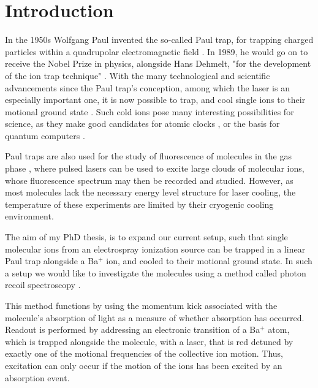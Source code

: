 
\chapter{Introduction}
\label{chap:intro}
In the 1950s Wolfgang Paul invented the so-called Paul trap, for trapping charged particles within a quadrupolar electromagnetic field \cite{PaulTrap}. In 1989, he would go on
 to receive the Nobel Prize in physics, alongside Hans Dehmelt, "for the development of the ion trap technique" \cite{NobelPrize.org}.
 With the many technological and scientific advancements since the Paul trap's conception, among which the laser is an especially important one,
 it is now possible to trap, and cool single ions to their motional ground state \cite{WinelandSideband}.
 Such cold ions pose many interesting possibilities for science, as they make good candidates for atomic clocks \cite{King2022},
 or the basis for quantum computers \cite{ZiracZoller,Kielpinski2002}.

Paul traps are also used for the study of fluorescence of molecules in the gas phase \cite{Kjaer2021-lm},
where pulsed lasers can be used to excite large clouds of molecular ions, whose fluorescence spectrum may then be recorded and studied.
However, as most molecules lack the necessary energy level structure for laser cooling, the temperature of these experiments are limited by their cryogenic cooling environment.


The aim of my PhD thesis, is to expand our current setup, such that single molecular ions from an electrospray ionization source \cite{FennEsi} can be trapped in a linear Paul trap alongside a Ba$^+$ ion, and cooled to their motional ground state.
In such a setup we would like to investigate the molecules using a method called photon recoil spectroscopy \cite{PRS}.

This method functions by using the momentum kick associated with the molecule's absorption of light
as a measure of whether absorption has occurred. Readout is performed by addressing an electronic transition of a Ba$^+$ atom, which is trapped alongside the molecule, with a laser, that is red detuned by exactly one of the motional frequencies of the collective ion motion. Thus, excitation can only occur if the motion of the ions has been excited by an absorption event.



